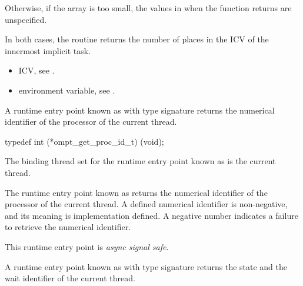 Otherwise, if the  array is too small, the values in  when the function returns are unspecified.

In both cases, the routine returns the number of places in the
 ICV of the innermost implicit task.

\crossreferences
\begin{itemize}
\item {} ICV, see
.

\item {} environment variable, see
.

\end{itemize}





\label{sec:ompt_get_proc_id_t}
\label{sec:ompt_get_proc_id}

\summary

A runtime entry point known as
 with type signature
 returns the numerical identifier
of the processor of the current thread.

\format

\begin{ccppspecific}
\begin{omptInquiry}
typedef int (*ompt_get_proc_id_t) (void);
\end{omptInquiry}
\end{ccppspecific}

\binding

The binding thread set for
the runtime entry point known as 
is the current thread.

\descr

The runtime entry point known as
 returns the numerical identifier
of the processor of the current thread.
A defined numerical identifier is non-negative, and
its meaning is implementation defined.
A negative number indicates a failure to retrieve the numerical identifier.

This runtime entry point is \emph{async signal safe}.






\label{sec:ompt_get_state_t}
\label{sec:ompt_get_state}

\summary
A runtime entry point known as 
with type signature 
returns the state and the wait identifier of the
current thread.

